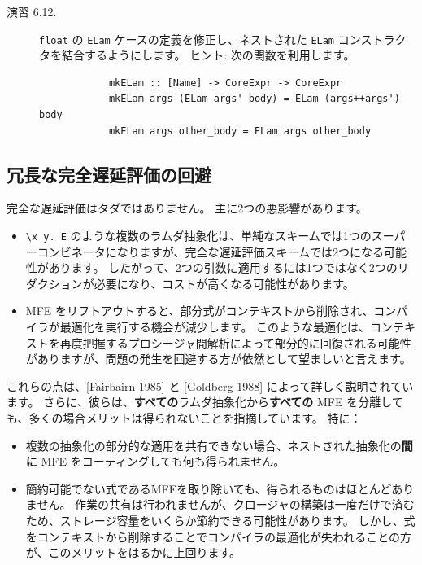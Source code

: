 \documentclass{jbook}
\begin{document}
\begin{description}
	\item[演習 6.12.] \texttt{float} の \texttt{ELam} ケースの定義を修正し、ネストされた \texttt{ELam} コンストラクタを結合するようにします。
		ヒント: 次の関数を利用します。
		\begin{verbatim}
			mkELam :: [Name] -> CoreExpr -> CoreExpr
			mkELam args (ELam args' body) = ELam (args++args') body
			mkELam args other_body = ELam args other_body
		\end{verbatim}
\end{description}

\subsection{冗長な完全遅延評価の回避}

完全な遅延評価はタダではありません。
主に2つの悪影響があります。

\begin{itemize}
	\item \texttt{\textbackslash x y. E} のような複数のラムダ抽象化は、単純なスキームでは1つのスーパーコンビネータになりますが、完全な遅延評価スキームでは2つになる可能性があります。
	      したがって、2つの引数に適用するには1つではなく2つのリダクションが必要になり、コストが高くなる可能性があります。
	\item MFE をリフトアウトすると、部分式がコンテキストから削除され、コンパイラが最適化を実行する機会が減少します。
	      このような最適化は、コンテキストを再度把握するプロシージャ間解析によって部分的に回復される可能性がありますが、問題の発生を回避する方が依然として望ましいと言えます。
\end{itemize}

これらの点は、[Fairbairn 1985] と [Goldberg 1988] によって詳しく説明されています。
さらに、彼らは、\textbf{すべての}ラムダ抽象化から\textbf{すべての} MFE を分離しても、多くの場合メリットは得られないことを指摘しています。
特に：

\begin{itemize}
	\item 複数の抽象化の部分的な適用を共有できない場合、ネストされた抽象化の\textbf{間に} MFE をコーティングしても何も得られません。
	\item 簡約可能でない式であるMFEを取り除いても、得られるものはほとんどありません。
	      作業の共有は行われませんが、クロージャの構築は一度だけで済むため、ストレージ容量をいくらか節約できる可能性があります。
	      しかし、式をコンテキストから削除することでコンパイラの最適化が失われることの方が、このメリットをはるかに上回ります。
\end{itemize}
\end{document}
